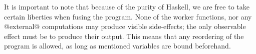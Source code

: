 It is important to note that because of the purity of Haskell, we are free to take certain liberties when fusing the program.
None of the worker functions, nor any @external@ computations may produce visible side-effects; the only observable effect must be to produce their output.
This means that any reordering of the program is allowed, as long as mentioned variables are bound beforehand.



